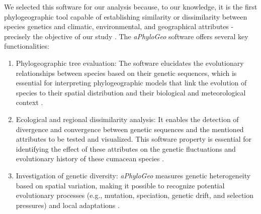 We selected this software for our analysis because, to our knowledge, it is the first phylogeographic tool capable of establishing similarity or dissimilarity between species genetics and climatic, environmental, and geographical attributes - precisely the objective of our study \citep{koshkarov_phylogeography_2022}. The \textit{aPhyloGeo} software offers several key functionalities:

\begin{enumerate}[label=\arabic*.]
\item Phylogeographic tree evaluation: The software elucidates the evolutionary relationships between species based on their genetic sequences, which is essential for interpreting phylogeographic models that link the evolution of species to their spatial distribution and their biological and meteorological context \citep{koshkarov_phylogeography_2022}.
\item Ecological and regional dissimilarity analysis: It enables the detection of divergence and convergence between genetic sequences and the mentioned attributes to be tested and visualized. This software property is essential for identifying the effect of these attributes on the genetic fluctuations and evolutionary history of these cumacean species \citep{koshkarov_phylogeography_2022}.
\item Investigation of genetic diversity: \textit{aPhyloGeo} measures genetic heterogeneity based on spatial variation, making it possible to recognize potential evolutionary processes (e.g., mutation, speciation, genetic drift, and selection pressures) and local adaptations \citep{manel_perspectives_2010}.
\end{enumerate}

